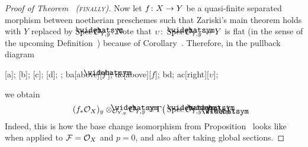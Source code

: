 \documentclass[a4paper,parskip=half,numbers=enddot, DIV=12]{scrreprt}
\begin{document}
\begin{proof}[Proof of Theorem~ \textsc{(finally)}]
Now let $f\colon X\morphism Y$ be a quasi-finite separated morphism between noetherian preschemes such that Zariski's main theorem holds with $Y$ replaced by $\Spec \roof{\Oo}_{Y,y}$. Note that $\upsilon\colon \Spec \roof{\Oo}_{Y,y}\morphism Y$ is flat (in the sense of the upcoming Definition~) because of Corollary~. Therefore, in the pullback diagram
\begin{diagram}
	;
	;
	;
	;
	;
	\scriptsize
	\arrow ba[above][$\roof{f}$];
	\arrow dc[above][$f$];
	\arrow bd;
	\arrow ac[right][$\upsilon$];
\end{diagram}
we obtain
\begin{align}\lbl{eq:froof*}
(f_*\Oo_X)_y\otimes_{\Oo_{Y,y}}\roof{\Oo}_{Y,y}\cong \Gamma\big(\Spec \roof{\Oo}_{Y,y},\roof{f}_*\Oo_{\roof{X}}\big)\;.
\end{align}
Indeed, this is how the base change isomorphism  from Proposition~ looks like when applied to $\mathcal{F}=\mathcal{O}_X$ and $p=0$, and also after taking global sections.%


\end{proof}
\end{document}
